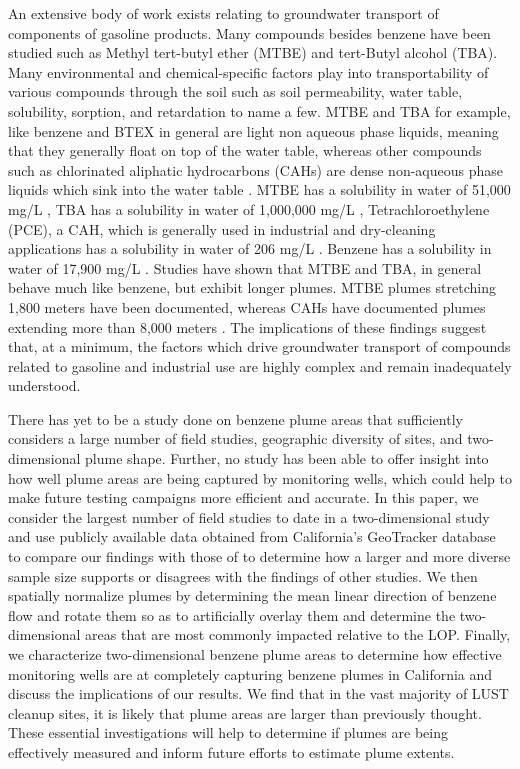 \documentclass[draft,linenumbers]{agujournal2018}
\begin{document}
An extensive body of work exists relating to groundwater transport of
components of gasoline products. Many compounds besides benzene have
been studied such as Methyl tert-butyl ether (MTBE) and tert-Butyl
alcohol (TBA). Many environmental and chemical-specific factors play
into transportability of various compounds through the soil such as soil
permeability, water table, solubility, sorption, and retardation to name
a few. MTBE and TBA for example, like benzene and BTEX in general are
light non aqueous phase liquids, meaning that they generally float on
top of the water table, whereas other compounds such as chlorinated
aliphatic hydrocarbons (CAHs) are dense non-aqueous phase liquids which
sink into the water table \citep{Stupp2007fuel}. MTBE has a solubility
in water of 51,000 mg/L \citep{pubchemMTBE}, TBA has a solubility in
water of 1,000,000 mg/L \citep{pubchemTBA}, Tetrachloroethylene (PCE), a
CAH, which is generally used in industrial and dry-cleaning applications
has a solubility in water of 206 mg/L \citep{pubchemPCE}. Benzene has a
solubility in water of 17,900 mg/L \citep{pubchemBenz}. Studies have
shown that MTBE and TBA, in general behave much like benzene, but
exhibit longer plumes. MTBE plumes stretching 1,800 meters have been
documented, whereas CAHs have documented plumes extending more than
8,000 meters \citep{Stupp2007fuel}. The implications of these findings
suggest that, at a minimum, the factors which drive groundwater
transport of compounds related to gasoline and industrial use are highly
complex and remain inadequately understood.

There has yet to be a study done on benzene plume areas that
sufficiently considers a large number of field studies, geographic
diversity of sites, and two-dimensional plume shape. Further, no study
has been able to offer insight into how well plume areas are being
captured by monitoring wells, which could help to make future testing
campaigns more efficient and accurate. In this paper, we consider the
largest number of field studies to date in a two-dimensional study and
use publicly available data obtained from California's GeoTracker
database to compare our findings with those of \citet{connor2015} to
determine how a larger and more diverse sample size supports or
disagrees with the findings of other studies. We then spatially
normalize plumes by determining the mean linear direction of benzene
flow and rotate them so as to artificially overlay them and determine
the two-dimensional areas that are most commonly impacted relative to
the LOP. Finally, we characterize two-dimensional benzene plume areas to
determine how effective monitoring wells are at completely capturing
benzene plumes in California and discuss the implications of our
results. We find that in the vast majority of LUST cleanup sites, it is
likely that plume areas are larger than previously thought. These
essential investigations will help to determine if plumes are being
effectively measured and inform future efforts to estimate plume
extents.
\end{document}
